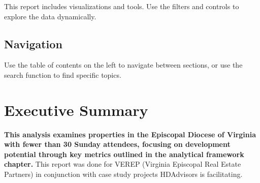 \documentclass[
  letterpaper,
  DIV=11,
  numbers=noendperiod,
  oneside]{scrreprt}
\begin{document}
\begin{tcolorbox}[enhanced jigsaw, bottomtitle=1mm, left=2mm, rightrule=.15mm, colbacktitle=quarto-callout-tip-color!10!white, arc=.35mm, title=\textcolor{quarto-callout-tip-color}{\faLightbulb}\hspace{0.5em}{Visualizations}, bottomrule=.15mm, colback=white, colframe=quarto-callout-tip-color-frame, leftrule=.75mm, titlerule=0mm, opacitybacktitle=0.6, breakable, coltitle=black, toptitle=1mm, toprule=.15mm, opacityback=0]

This report includes visualizations and tools. Use the filters and
controls to explore the data dynamically.

\end{tcolorbox}

\section{Navigation}\label{navigation}

Use the table of contents on the left to navigate between sections, or
use the search function to find specific topics.


\chapter*{Executive Summary}\label{executive-summary}


\textbf{This analysis examines properties in the Episcopal Diocese of
Virginia with fewer than 30 Sunday attendees, focusing on development
potential through key metrics outlined in the analytical framework
chapter.} This report was done for VEREP (Virginia Episcopal Real Estate
Partners) in conjunction with case study projects HDAdvisors is
facilitating.
\end{document}
